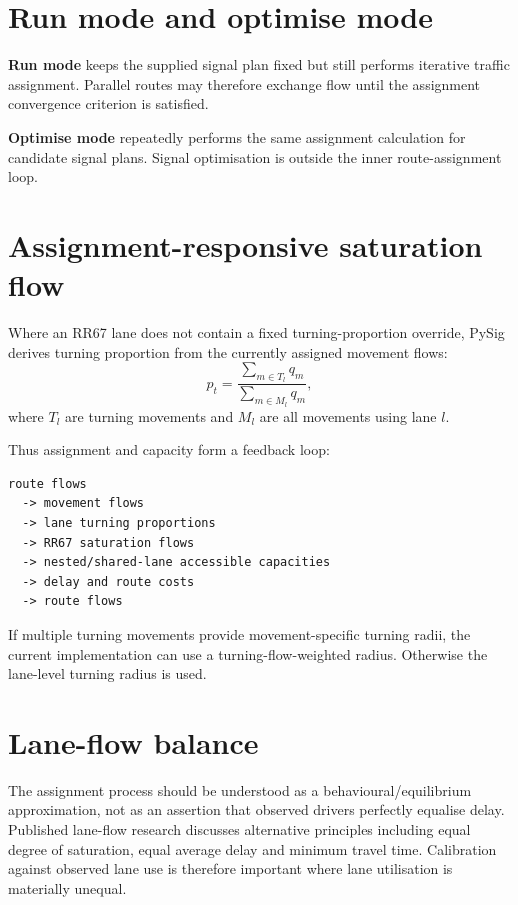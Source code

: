 \section{Run mode and optimise mode}
\textbf{Run mode} keeps the supplied signal plan fixed but still performs iterative
traffic assignment.  Parallel routes may therefore exchange flow until the assignment
convergence criterion is satisfied.

\textbf{Optimise mode} repeatedly performs the same assignment calculation for candidate
signal plans.  Signal optimisation is outside the inner route-assignment loop.

\section{Assignment-responsive saturation flow}
Where an RR67 lane does not contain a fixed turning-proportion override, PySig derives
turning proportion from the currently assigned movement flows:
\begin{equation}
p_t=\frac{\sum_{m\in T_l}q_m}{\sum_{m\in M_l}q_m},
\end{equation}
where $T_l$ are turning movements and $M_l$ are all movements using lane $l$.

Thus assignment and capacity form a feedback loop:

\begin{verbatim}
route flows
  -> movement flows
  -> lane turning proportions
  -> RR67 saturation flows
  -> nested/shared-lane accessible capacities
  -> delay and route costs
  -> route flows
\end{verbatim}

If multiple turning movements provide movement-specific turning radii, the current
implementation can use a turning-flow-weighted radius.  Otherwise the lane-level
turning radius is used.

\section{Lane-flow balance}
The assignment process should be understood as a behavioural/equilibrium approximation,
not as an assertion that observed drivers perfectly equalise delay.  Published
lane-flow research discusses alternative principles including equal degree of saturation,
equal average delay and minimum travel time.  Calibration against observed lane use is
therefore important where lane utilisation is materially unequal.
